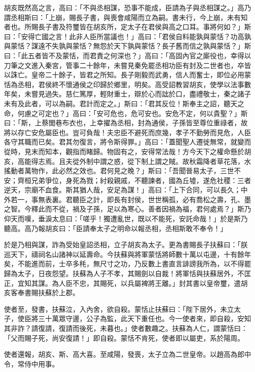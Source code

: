 \begin{pinyinscope}
胡亥既然高之言，高曰：「不與丞相謀，恐事不能成，臣請為子與丞相謀之。」高乃謂丞相斯曰：「上崩，賜長子書，與喪會咸陽而立為嗣。書未行，今上崩，未有知者也。所賜長子書及符璽皆在胡亥所，定太子在君侯與高之口耳。事將何如？」斯曰：「安得亡國之言！此非人臣所當議也！」高曰：「君侯自料能孰與蒙恬？功高孰與蒙恬？謀遠不失孰與蒙恬？無怨於天下孰與蒙恬？長子舊而信之孰與蒙恬？」斯曰：「此五者皆不及蒙恬，而君責之何深也？」高曰：「高固內官之廝役也，幸得以刀筆之文進入秦宮，管事二十餘年，未嘗見秦免罷丞相功臣有封及二世者也，卒皆以誅亡。皇帝二十餘子，皆君之所知。長子剛毅而武勇，信人而奮士，即位必用蒙恬為丞相，君侯終不懷通侯之印歸於鄉里，明矣。高受詔教習胡亥，使學以法事數年矣，未嘗見過失。慈仁篤厚，輕財重士，辯於心而詘於口，盡禮敬士，秦之諸子未有及此者，可以為嗣。君計而定之。」斯曰：「君其反位！斯奉主之詔，聽天之命，何慮之可定也？」高曰：「安可危也，危可安也。安危不定，何以貴聖？」斯曰：「斯，上蔡閭巷布衣也，上幸擢為丞相，封為通侯，子孫皆至尊位重祿者，故將以存亡安危屬臣也。豈可負哉！夫忠臣不避死而庶幾，孝子不勤勞而見危，人臣各守其職而已矣。君其勿復言，將令斯得罪。」高曰：「蓋聞聖人遷徙無常，就變而從時，見末而知本，觀指而睹歸。物固有之，安得常法哉！方今天下之權命懸於胡亥，高能得志焉。且夫從外制中謂之惑，從下制上謂之賊。故秋霜降者草花落，水搖動者萬物作，此必然之效也。君何見之晚？」斯曰：「吾聞晉易太子，三世不安；齊桓兄弟爭位，身死為戮；紂殺親戚，不聽諫者，國為丘墟，遂危社稷：三者逆天，宗廟不血食。斯其猶人哉，安足為謀！」高曰：「上下合同，可以長久；中外若一，事無表裏。君聽臣之計，即長有封侯，世世稱孤，必有喬松之壽，孔、墨之智。今釋此而不從，禍及子孫，足以為寒心。善者因禍為福，君何處焉？」斯乃仰天而嘆，垂淚太息曰：「嗟乎！獨遭亂世，既以不能死，安託命哉！」於是斯乃聽高。高乃報胡亥曰：「臣請奉太子之明命以報丞相，丞相斯敢不奉令！」

於是乃相與謀，詐為受始皇詔丞相，立子胡亥為太子。更為書賜長子扶蘇曰：「朕巡天下，禱祠名山諸神以延壽命。今扶蘇與將軍蒙恬將師數十萬以屯邊，十有餘年矣，不能進而前，士卒多秏，無尺寸之功，乃反數上書直言誹謗我所為，以不得罷歸為太子，日夜怨望。扶蘇為人子不孝，其賜劍以自裁！將軍恬與扶蘇居外，不匡正，宜知其謀。為人臣不忠，其賜死，以兵屬裨將王離。」封其書以皇帝璽，遣胡亥客奉書賜扶蘇於上郡。

使者至，發書，扶蘇泣，入內舍，欲自殺。蒙恬止扶蘇曰：「陛下居外，未立太子，使臣將三十萬眾守邊，公子為監，此天下重任也。今一使者來，即自殺，安知其非詐？請復請，復請而後死，未暮也。」使者數趣之。扶蘇為人仁，謂蒙恬曰：「父而賜子死，尚安復請！」即自殺。蒙恬不肯死，使者即以屬吏，系於陽周。

使者還報，胡亥、斯、高大喜。至咸陽，發喪，太子立為二世皇帝。以趙高為郎中令，常侍中用事。


\end{pinyinscope}
